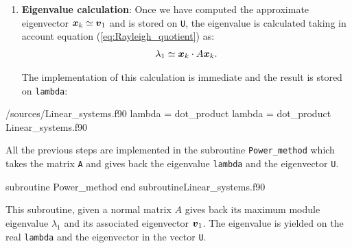      \begin{enumerate}[resume]
     	\item \textbf{Eigenvalue calculation}: Once we have computed the approximate eigenvector $\boldsymbol{x}_{k}\simeq\boldsymbol{v}_1$ and is stored on \verb|U|, the eigenvalue is calculated taking in account equation (\ref{eq:Rayleigh_quotient}) as:
     	\begin{align}
     		\lambda_1 \simeq \boldsymbol{x}_{k}\cdot A\boldsymbol{x}_{k}.
     	\end{align}
     	
     	The implementation of this calculation is immediate and the result is stored on \verb|lambda|:
     \end{enumerate}
     	\vspace{0.5cm} 
     	\listings
     	{\home/sources/Linear_systems.f90}
     	{lambda = dot_product}
     	{lambda = dot_product}
     	{Linear_systems.f90}
     
     \newpage
     All the previous steps are implemented in the subroutine \verb|Power_method| which takes the matrix \verb|A| and gives back the eigenvalue \verb|lambda| and the eigenvector \verb|U|. 
     
     \vspace{0.5cm} 
     {subroutine Power_method}
     {end subroutine}{Linear_systems.f90}
     
     This subroutine, given a normal matrix $A$ gives back its maximum module eigenvalue $\lambda_1$ and its associated eigenvector $\boldsymbol{v}_1$. The eigenvalue is yielded on the real \verb|lambda| and the eigenvector in the vector \verb|U|.
     
